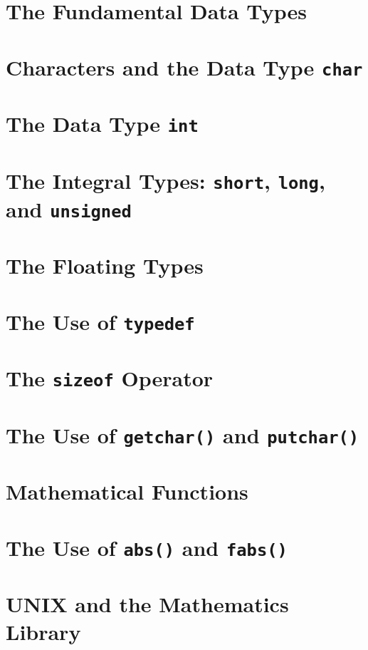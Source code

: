 \documentclass[12pt]{book}
\begin{document}
\section{The Fundamental Data Types} \label{sec:fundamental_data_types}
\section{Characters and the Data Type \texttt{char}} \label{sec:char_data_type}
\section{The Data Type \texttt{int}} \label{sec:int_data_type}
\section{The Integral Types: \texttt{short}, \texttt{long}, and \texttt{unsigned}} \label{sec:integral_types}
\section{The Floating Types} \label{sec:floating_types}
\section{The Use of \texttt{typedef}} \label{sec:use_of_typedef}
\section{The \texttt{sizeof} Operator} \label{sec:sizeof_operator}
\section{The Use of \texttt{getchar()} and \texttt{putchar()}} \label{sec:getchar_putchar}
\section{Mathematical Functions} \label{sec:mathematical_functions}
\section{The Use of \texttt{abs()} and \texttt{fabs()}} \label{sec:abs_fabs}
\section{UNIX and the Mathematics Library} \label{sec:unix_math_library}
\end{document}
